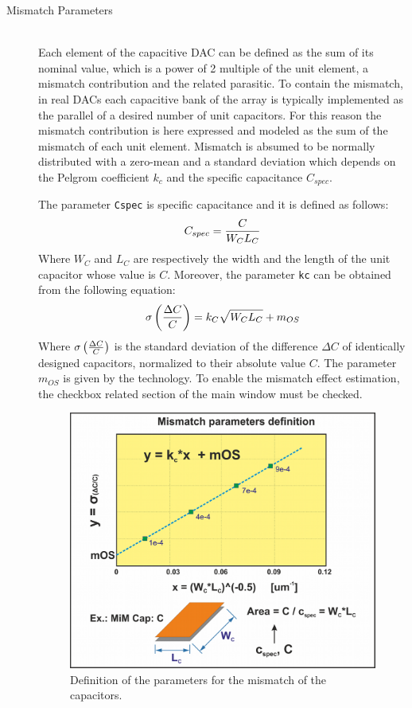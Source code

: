 \begin{description}
	\item[Mismatch Parameters] \hfill \\
          Each element of the capacitive DAC can be defined as the sum of its nominal value, which is a power of 2 multiple of the unit element, a mismatch contribution and the related parasitic. To contain the mismatch, in real DACs each capacitive bank of the array is typically implemented as the parallel of a desired number of unit capacitors.
 For this reason the mismatch contribution is here expressed and modeled as the sum of the mismatch of each unit element. Mismatch is absumed to be normally distributed with a zero-mean and a standard deviation which depends on the Pelgrom coefficient $k_{c}$ and the specific capacitance $C_{spec}$.

	The parameter \texttt{Cspec} is specific capacitance and it is defined as follows:
\begin{equation}
	C_{spec} = {C \over {W_{C} L_{C}}}
\end{equation}
\noindent Where $W_{C}$ and $L_{C}$ are respectively the width and the length of the unit capacitor whose value is $C$. Moreover, the parameter \texttt{kc} can be obtained from the following equation:
\begin{equation}
	\sigma \left ({\Delta C \over C} \right ) = k_{C} \sqrt{W_{C} L_{C}} + m_{OS}
\end{equation}
\noindent Where $\sigma \left ({\Delta C \over C} \right )$ is the standard deviation of the difference $\Delta C$ of identically designed capacitors, normalized to their absolute value $C$. The parameter $m_{OS}$ is given by the technology.
To enable the mismatch effect estimation, the checkbox related section of the main window must be checked.
\begin{figure}[h!]
	\centering
	\includegraphics[scale=0.8]{pics/mismatch.png}
	\caption{Definition of the parameters for the mismatch of the capacitors.}
	\label{fig:mismatch}
\end{figure}


\end{description}

